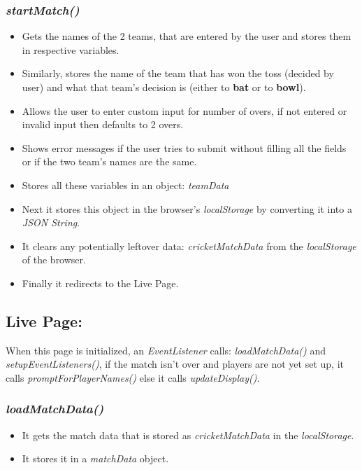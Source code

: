 \documentclass[a4paper,12pt]{article}
\begin{document}
\subsubsection{\textit{startMatch()}}
\begin{itemize}
\item Gets the names of the 2 teams, that are entered by the user and stores them in respective variables.
\item Similarly, stores the name of the team that has won the toss (decided by user) and what that team's decision is (either to \textbf{bat} or to \textbf{bowl}).
\item Allows the user to enter custom input for number of overs, if not entered or invalid input then defaults to 2 overs.
\item Shows error messages if the user tries to submit without filling all the fields or if the two team's names are the same.
\item Stores all these variables in an object: \textit{teamData}
\item Next it stores this object in the browser's \textit{localStorage} by converting it into a \textit{JSON String}.
\item It clears any potentially leftover data: \textit{cricketMatchData} from the \textit{localStorage} of the browser.
\item Finally it redirects to the Live Page.
\end{itemize}

\subsection{Live Page:}
When this page is initialized, an \textit{EventListener} calls: \textit{loadMatchData()} and \textit{setupEventListeners()}, 
if the match isn't over and players are not yet set up, it calls \textit{promptForPlayerNames()} else it calls \textit{updateDisplay()}.
\subsubsection{\textit{loadMatchData()}}
\begin{itemize}
\item It gets the match data that is stored as \textit{cricketMatchData} in the \textit{localStorage}.
\item It stores it in a \textit{matchData} object. 
\end{itemize}
\end{document}
